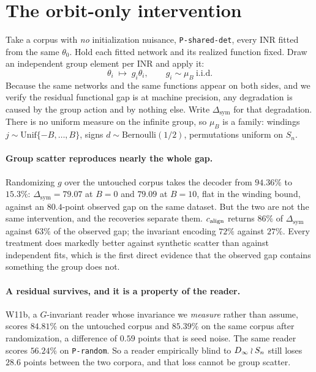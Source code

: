 \section{The orbit-only intervention}\label{sec:orbit}

Take a corpus with \emph{no} initialization nuisance, \texttt{P-shared-det}, every INR fitted from
the same $\theta_0$. Hold each fitted network and its realized function fixed. Draw an independent
group element per INR and apply it:
\begin{equation}
\theta_i \;\longmapsto\; g_i\theta_i, \qquad g_i \sim \mu_B \ \text{i.i.d.}
\label{eq:orbit-intervention}
\end{equation}
Because the same networks and the same functions appear on both sides, and we verify the residual
functional gap is at machine precision, any degradation is caused by the group action and by nothing
else. Write $\Delta_{\mathrm{sym}}$ for that degradation. There is no uniform measure on the
infinite group, so $\mu_B$ is a family: windings $j \sim \mathrm{Unif}\{-B,\dots,B\}$, signs
$d \sim \mathrm{Bernoulli}(1/2)$, permutations uniform on $S_n$.



\paragraph{Group scatter reproduces nearly the whole gap.} Randomizing $g$ over the untouched
corpus takes the decoder from $94.36\%$ to $15.3\%$: $\Delta_{\mathrm{sym}} = 79.07$ at $B=0$ and
$79.09$ at $B=10$, flat in the winding bound, against an $80.4$-point observed gap on the same
dataset. But the two are not the same intervention, and the recoveries separate them. $c_{\mathrm{align}}$
returns $86\%$ of $\Delta_{\mathrm{sym}}$ against $63\%$ of the observed gap; the invariant encoding
$72\%$ against $27\%$. Every treatment does markedly better against synthetic scatter than against
independent fits, which is the first direct evidence that the observed gap contains something the
group does not.

\paragraph{A residual survives, and it is a property of the reader.} W11b, a $G$-invariant reader
whose invariance we \emph{measure} rather than assume, scores $84.81\%$ on the untouched corpus and
$85.39\%$ on the same corpus after randomization, a difference of $0.59$ points that is seed noise.
The same reader scores $56.24\%$ on \texttt{P-random}. So a reader empirically blind to
$D_\infty \wr S_n$ still loses $28.6$ points between the two corpora, and that loss cannot be group
scatter.

